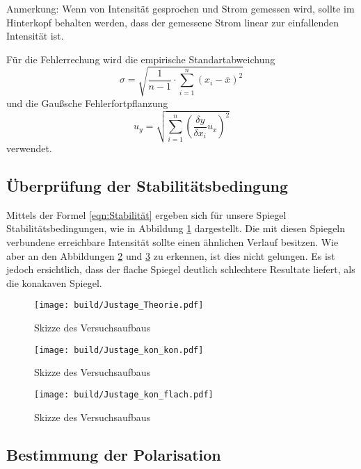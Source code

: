 Anmerkung: Wenn von Intensität gesprochen und Strom gemessen wird, sollte im Hinterkopf behalten werden, dass der gemessene Strom linear zur einfallenden Intensität ist.

Für die Fehlerrechung wird die empirische Standartabweichung
\begin{equation}
  \sigma = \sqrt{\frac{1}{n-1} \cdot \sum_{i=1}^n(x_i-\overline{x})^2}
  \label{eqn:Stdabweichung}
\end{equation}
und die Gaußsche Fehlerfortpflanzung
\begin{equation}
  u_y = \sqrt{\sum_{i=1}^n\left(\frac{\delta y}{\delta x_i}u_x\right)^2}
  \label{eqn:gauß}
\end{equation}
verwendet.

\subsection{Überprüfung der Stabilitätsbedingung}
Mittels der Formel \eqref{eqn:Stabilität} ergeben sich für unsere Spiegel Stabilitätsbedingungen, wie in Abbildung \ref{fig:Stabilität_Theorie} dargestellt. 
Die mit diesen Spiegeln verbundene erreichbare Intensität sollte einen ähnlichen Verlauf besitzen.
Wie aber an den Abbildungen \ref{fig:Stabilität_kon_kon} und \ref{fig:Stabilität_kon_flach} zu erkennen, ist dies nicht gelungen.
Es ist jedoch ersichtlich, dass der flache Spiegel deutlich schlechtere Resultate liefert, als die konakaven Spiegel.

\begin{figure}
  \centering
  \texttt{[image: build/Justage\_Theorie.pdf]}
  \caption{Skizze des Versuchsaufbaus}
  \label{fig:Stabilität_Theorie}
\end{figure}


\begin{figure}
  \centering
  \texttt{[image: build/Justage\_kon\_kon.pdf]}
  \caption{Skizze des Versuchsaufbaus}
  \label{fig:Stabilität_kon_kon}
\end{figure}

\begin{figure}
  \centering
  \texttt{[image: build/Justage\_kon\_flach.pdf]}
  \caption{Skizze des Versuchsaufbaus}
  \label{fig:Stabilität_kon_flach}
\end{figure}

\subsection{Bestimmung der Polarisation}

